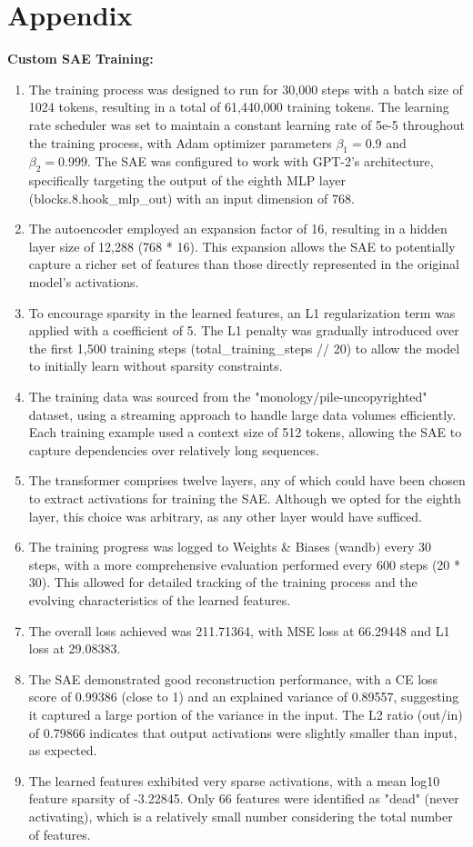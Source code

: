 \section{Appendix}

\hypertarget{sae-training}{%
\textbf{Custom SAE Training:} 
\begin{enumerate}
    \item The training process was designed to run for 30,000 steps with a batch size of 1024 tokens, resulting in a total of 61,440,000 training tokens. The learning rate scheduler was set to maintain a constant learning rate of 5e-5 throughout the training process, with Adam optimizer parameters $\beta_{1} = 0.9$ and $\beta_{2} = 0.999$. The SAE was configured to work with GPT-2's architecture, specifically targeting the output of the eighth MLP layer (blocks.8.hook\_mlp\_out) with an input dimension of 768.
    \item The autoencoder employed an expansion factor of 16, resulting in a hidden layer size of 12,288 (768 * 16). This expansion allows the SAE to potentially capture a richer set of features than those directly represented in the original model's activations.
    \item To encourage sparsity in the learned features, an L1 regularization term was applied with a coefficient of 5. The L1 penalty was gradually introduced over the first 1,500 training steps (total\_training\_steps // 20) to allow the model to initially learn without sparsity constraints.
    \item The training data was sourced from the "monology/pile-uncopyrighted" dataset, using a streaming approach to handle large data volumes efficiently. Each training example used a context size of 512 tokens, allowing the SAE to capture dependencies over relatively long sequences.
    \item The transformer comprises twelve layers, any of which could have been chosen to extract activations for training the SAE. Although we opted for the eighth layer, this choice was arbitrary, as any other layer would have sufficed.
    \item The training progress was logged to Weights \& Biases (wandb) every 30 steps, with a more comprehensive evaluation performed every 600 steps (20 * 30). This allowed for detailed tracking of the training process and the evolving characteristics of the learned features.
    \item The overall loss achieved was 211.71364, with MSE loss at 66.29448 and L1 loss at 29.08383.
    \item The SAE demonstrated good reconstruction performance, with a CE loss score of 0.99386 (close to 1) and an explained variance of 0.89557, suggesting it captured a large portion of the variance in the input. The L2 ratio (out/in) of 0.79866 indicates that output activations were slightly smaller than input, as expected.
    \item The learned features exhibited very sparse activations, with a mean log10 feature sparsity of -3.22845. Only 66 features were identified as "dead" (never activating), which is a relatively small number considering the total number of features.
\end{enumerate}
}

